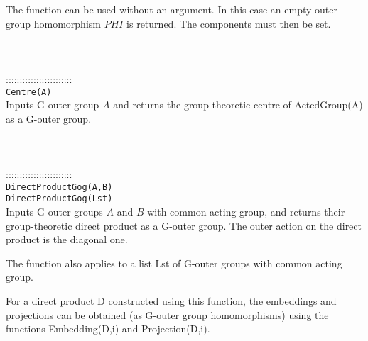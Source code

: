 \documentclass[a4paper,11pt]{report}
\begin{document}
{ The function can be used without an argument. In this case an empty outer
group homomorphism $PHI$ is returned. The components must then be set. \\
 \\
 \\
 \\
 ::::::::::::::::::::::::\\
 \texttt{Centre(A)}\\
 

 Inputs G-outer group $A$ and returns the group theoretic centre of ActedGroup(A) as a G-outer group. \\
 \\
 \\
 \\
 ::::::::::::::::::::::::\\
 \texttt{DirectProductGog(A,B)}\\
 \texttt{DirectProductGog(Lst)}\\
 

 Inputs G-outer groups $A$ and $B$ with common acting group, and returns their group-theoretic direct product as
a G-outer group. The outer action on the direct product is the diagonal one. 

 The function also applies to a list Lst of G-outer groups with common acting
group. 

 For a direct product D constructed using this function, the embeddings and
projections can be obtained (as G-outer group homomorphisms) using the
functions Embedding(D,i) and Projection(D,i). \\
 \\
 \\
 }

 
\end{document}
